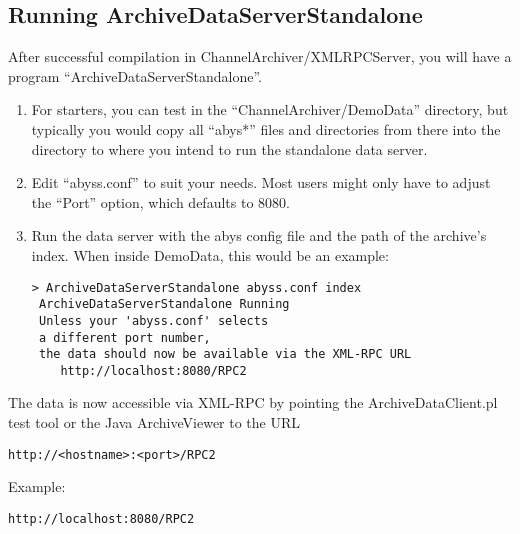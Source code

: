 \subsection{Running ArchiveDataServerStandalone} %
After successful compilation in ChannelArchiver/XMLRPCServer, you will
have a program ``ArchiveDataServerStandalone''.

\begin{enumerate}
\item For starters, you can test in the ``ChannelArchiver/DemoData''
      directory, but typically you would copy all ``abys*'' files and
      directories from there into the directory to where you intend to
      run the standalone data server.
\item Edit ``abyss.conf'' to suit your needs. Most users might only
      have to adjust the ``Port'' option, which defaults to 8080.
\item Run the data server with the abys config file and the path of
  the archive's index. When inside DemoData, this would be an example:
\begin{lstlisting}[keywordstyle=\sffamily]
> ArchiveDataServerStandalone abyss.conf index 
 ArchiveDataServerStandalone Running
 Unless your 'abyss.conf' selects
 a different port number,
 the data should now be available via the XML-RPC URL
    http://localhost:8080/RPC2
\end{lstlisting}
\end{enumerate}

\noindent The data is now accessible via XML-RPC by
pointing the ArchiveDataClient.pl test tool or the Java
ArchiveViewer to the URL
\begin{lstlisting}[keywordstyle=\sffamily]
     http://<hostname>:<port>/RPC2
\end{lstlisting}
\noindent Example:
\begin{lstlisting}[keywordstyle=\sffamily]
    http://localhost:8080/RPC2
\end{lstlisting}

